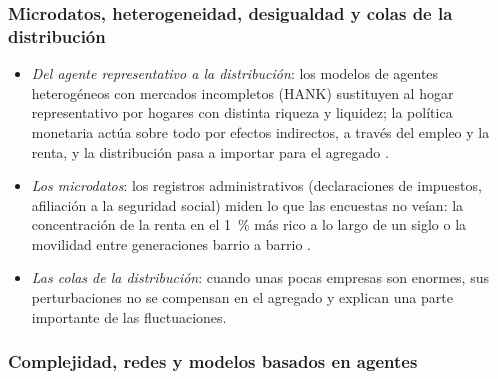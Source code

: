 \documentclass[11pt]{article}
\begin{document}
\subsubsection{Microdatos, heterogeneidad, desigualdad y colas de la distribución}\label{sec:heterogeneidad}

\begin{itemize}
\item \emph{Del agente representativo a la distribución}: los modelos de agentes heterogéneos con mercados incompletos (HANK) sustituyen al hogar representativo por hogares con distinta riqueza y liquidez; la política monetaria actúa sobre todo por efectos indirectos, a través del empleo y la renta, y la distribución pasa a importar para el agregado\nocite{KaplanMollViolante2018Monetary}  .
\item \emph{Los microdatos}: los registros administrativos (declaraciones de impuestos, afiliación a la seguridad social) miden lo que las encuestas no veían: la concentración de la renta en el 1~\% más rico a lo largo de un siglo\nocite{PikettySaez2003Income,Piketty2014}  o la movilidad entre generaciones barrio a barrio\nocite{ChettyEtAl2014Land} .
\item \emph{Las colas de la distribución}: cuando unas pocas empresas son enormes, sus perturbaciones no se compensan en el agregado y explican una parte importante de las fluctuaciones\nocite{Gabaix2011Granular}.
\end{itemize}

\subsubsection{Complejidad, redes y modelos basados en agentes}\label{sec:complejidad}
\end{document}
